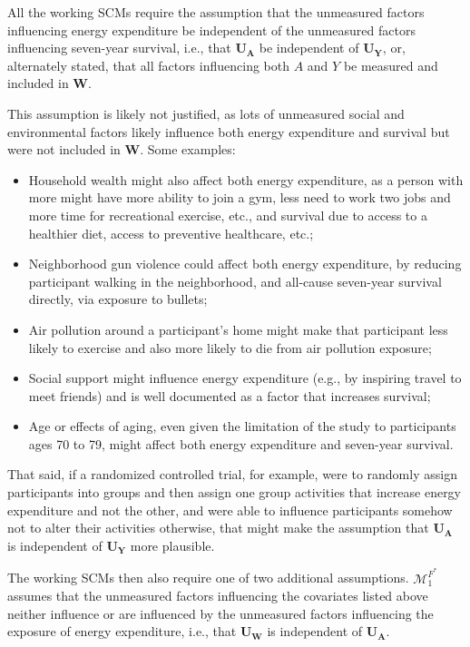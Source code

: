 \documentclass{article}\usepackage[]{graphicx}\usepackage[]{xcolor}
\begin{document}
\begin{enumerate}[label=\textbf{\arabic*.}]
\begin{enumerate}[label=\textbf{(\alph*)}]
All the working SCMs require the assumption that the unmeasured factors influencing energy expenditure be independent of the unmeasured factors influencing seven-year survival, i.e., that $\bm{U_A}$ be independent of $\bm{U_Y}$, or, alternately stated, that all factors influencing both $A$ and $Y$ be measured and included in $\bm{W}$. 

This assumption is likely not justified, as lots of unmeasured social and environmental factors likely influence both energy expenditure and survival but were not included in $\bm{W}$. Some examples:

\begin{itemize}

  \item Household wealth might also affect both energy expenditure, as a person with more might have more ability to join a gym, less need to work two jobs and more time for recreational exercise, etc., and survival due to access to a healthier diet, access to preventive healthcare, etc.; 
  \item Neighborhood gun violence could affect both energy expenditure, by reducing participant walking in the neighborhood, and all-cause seven-year survival directly, via exposure to bullets;
  \item Air pollution around a participant's home might make that participant less likely to exercise and also more likely to die from air pollution exposure;
  \item Social support might influence energy expenditure (e.g., by inspiring travel to meet friends) and is well documented as a factor that increases survival;
  \item Age or effects of aging, even given the limitation of the study to participants ages 70 to 79, might affect both energy expenditure and seven-year survival.

\end{itemize}

That said, if a randomized controlled trial, for example, were to randomly assign participants into groups and then assign one group activities that increase energy expenditure and not the other, and were able to influence participants somehow not to alter their activities otherwise, that might make the assumption that $\bm{U_A}$ is independent of $\bm{U_Y}$ more plausible.

The working SCMs then also require one of two additional assumptions. $\mathcal{M}^{F^*}_1$ assumes that the unmeasured factors influencing the covariates listed above neither influence or are influenced by the unmeasured factors influencing the exposure of energy expenditure, i.e., that $\bm{U_W}$ is independent of $\bm{U_A}$.


\end{enumerate}
\end{enumerate}
\end{document}
